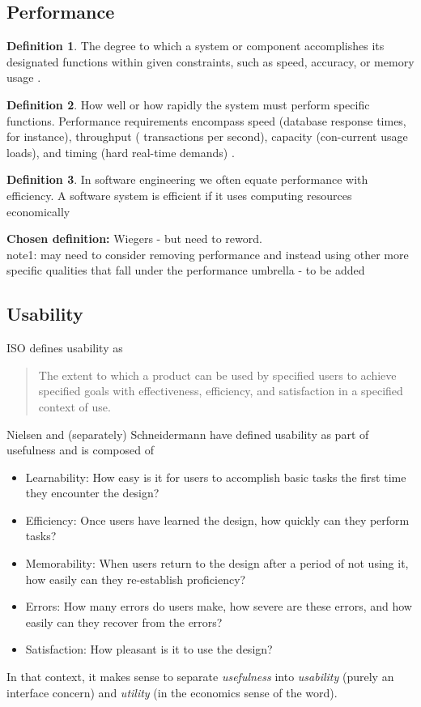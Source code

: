 \documentclass[letterpaper,cleveref]{lipics-v2019}
\theoremstyle{definition}
\newtheorem{defn}{Definition}
\begin{document}
\subsection{Performance}
\begin{defn}
The degree to which a system or component accomplishes its designated functions within given constraints, such as speed, accuracy, or memory usage \cite{IEEEStdGlossarySET1990}.\\
\end{defn}
\begin{defn}
How well or how rapidly the system must perform specific functions. Performance requirements encompass speed (database response times, for instance), throughput ( transactions per second), capacity (con-current usage loads), and timing (hard real-time demands) \cite{wiegers2003softreq}.
\end{defn}
\begin{defn}
In software engineering we often equate performance with efficiency. A software system is efficient if it uses computing resources economically \cite{ghezzi1991fundamentals}\\
\end{defn}

\textbf{Chosen definition:}
Wiegers - but need to reword.\\

note1: may need to consider removing performance and instead using other more specific qualities that fall under the performance umbrella - to be added\\


\subsection{Usability}

ISO defines usability as
\begin{quote}
The extent to which a product can be used by specified users to achieve
specified goals with effectiveness, efficiency, and satisfaction in a specified
context of use.
\end{quote}

Nielsen and (separately) Schneidermann have defined usability as part of usefulness and
is composed of
\begin{itemize}
\item Learnability: How easy is it for users to accomplish basic tasks the
  first time they encounter the design?
\item Efficiency: Once users have learned the design, how quickly can they perform tasks?
\item Memorability: When users return to the design after a period of not using
  it, how easily can they re-establish proficiency?
\item Errors: How many errors do users make, how severe are these errors, and
  how easily can they recover from the errors?
\item Satisfaction: How pleasant is it to use the design?
\end{itemize}
In that context, it makes sense to separate \emph{usefulness} into
\emph{usability} (purely an interface concern) and \emph{utility} (in the economics
sense of the word).
\end{document}
